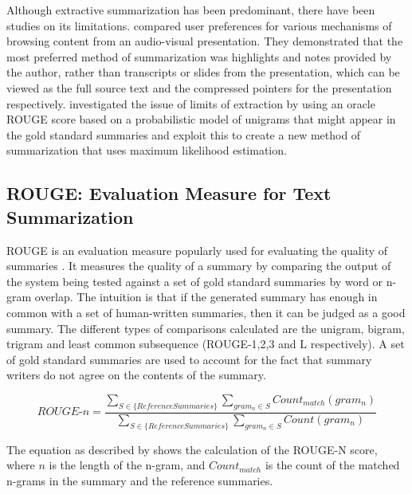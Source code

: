 Although extractive summarization has been predominant, there have been studies on its limitations. \cite{he2000comparing} compared user preferences for various mechanisms of browsing content from an audio-visual presentation. They demonstrated that the most preferred method of summarization was highlights and notes provided by the author, rather than transcripts or slides from the presentation, which can be viewed as the full source text and the compressed pointers for the presentation respectively. \cite{conroy2006topic} investigated the issue of limits of extraction by using an oracle ROUGE score based on a probabilistic model of unigrams that might appear in the gold standard summaries and exploit this to create a new method of summarization that uses maximum likelihood estimation.


\subsection{ROUGE: Evaluation Measure for Text Summarization}

ROUGE is an evaluation measure popularly used for evaluating the quality of summaries \citep{lin-2004}. It measures the quality of a summary by comparing the output of the system being tested against a set of gold standard summaries by word or n-gram overlap. The intuition is that if the generated summary has enough in common with a set of human-written summaries, then it can be judged as a good summary. The different types of comparisons calculated are the unigram, bigram, trigram and least common subsequence (ROUGE-1,2,3 and L respectively). A set of gold standard summaries are used to account for the fact that summary writers do not agree on the contents of the summary. 

\begin{equation}
\textit{ROUGE-n} = \frac{\sum\limits_{S \in \{Reference Summaries\}} \sum\limits_{gram_n \in S} Count_{match}(gram_n)}{\sum\limits_{S \in \{Reference Summaries\}} \sum\limits_{gram_n \in S} Count(gram_n)}
\end{equation}

The equation as described by \cite{lin2004looking} shows the calculation of the ROUGE-N score, where $n$ is the length of the n-gram, and $Count_{match}$ is the count of the matched n-grams in the summary and the reference summaries.

